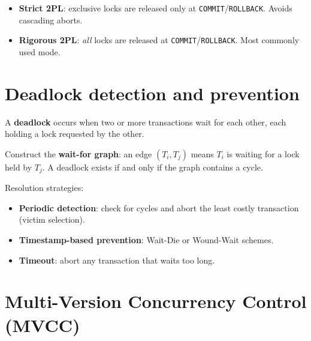 \begin{definition}
\begin{itemize}
  \item \textbf{Strict 2PL}: exclusive locks are released only at
        \texttt{COMMIT}/\texttt{ROLLBACK}. Avoids cascading aborts.
  \item \textbf{Rigorous 2PL}: \emph{all} locks are released at
        \texttt{COMMIT}/\texttt{ROLLBACK}. Most commonly used mode.
\end{itemize}
\end{definition}

\section{Deadlock detection and prevention}

\begin{definition}[Deadlock]
A \textbf{deadlock} occurs when two or more transactions wait for each
other, each holding a lock requested by the other.
\end{definition}

\begin{proposition}
Construct the \textbf{wait-for graph}: an edge $(T_i, T_j)$ means $T_i$
is waiting for a lock held by $T_j$. A deadlock exists if and only if the
graph contains a cycle.
\end{proposition}

Resolution strategies:
\begin{itemize}
  \item \textbf{Periodic detection}: check for cycles and abort the least
        costly transaction (victim selection).
  \item \textbf{Timestamp-based prevention}: Wait-Die or Wound-Wait schemes.
  \item \textbf{Timeout}: abort any transaction that waits too long.
\end{itemize}

\section{Multi-Version Concurrency Control (MVCC)}

